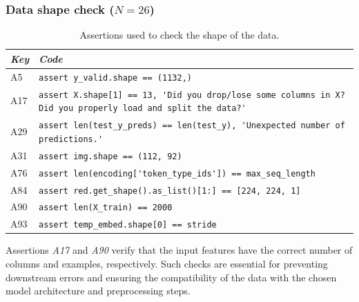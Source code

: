 \subsubsection{Data shape check ($N = 26$)}


\begin{table}
  \centering
  \caption{Assertions used to check the shape of the data.}
  \begin{tabular}{@{}m{} m{}@{}}
    \toprule
    \emph{\textbf{Key}}&
    \emph{\textbf{Code}}\\
    \midrule

    A5 &
    \lstinline[]$assert y_valid.shape == (1132,)$\\

    A17 &
    \lstinline[]$assert X.shape[1] == 13, 'Did you drop/lose some columns in X? Did you properly load and split the data?'$\\

    A29 &
    \lstinline[]$assert len(test_y_preds) == len(test_y), 'Unexpected number of predictions.'$\\

    A31 &
    \lstinline[]$assert img.shape == (112, 92)$\\

    A76 &
    \lstinline[]$assert len(encoding['token_type_ids']) == max_seq_length$\\

    A84 &
    \lstinline[]$assert red.get_shape().as_list()[1:] == [224, 224, 1]$\\

    A90 &
    \lstinline[]$assert len(X_train) == 2000$\\

    A93 &
    \lstinline[]$assert temp_embed.shape[0] == stride$\\
    \bottomrule
  \end{tabular}
  \label{tab:assert-shape-check}
\end{table}


Assertions \emph{A17} and \emph{A90} verify that the input features have the correct number of columns and examples, respectively. Such checks are essential for preventing downstream errors and ensuring the compatibility of the data with the chosen model architecture and preprocessing steps. 

